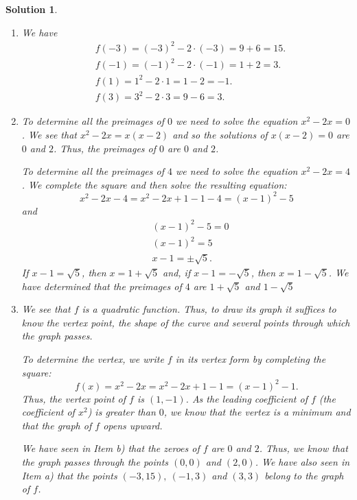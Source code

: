 \documentclass[12pt]{article}
\newtheorem{sol}[prop]{Solution}
\begin{document}
\begin{sol}
\begin{enumerate}
\item[a)]  We have 
\begin{equation*}
\begin{split}
& f(-3)=(-3)^{2}-2\cdot (-3)=9+6=15.\\
& f(-1)=(-1)^{2}-2\cdot (-1)=1+2=3.\\
& f(1)=1^{2}-2\cdot 1=1-2=-1.\\
& f(3)=3^{2}-2\cdot 3=9-6=3.
\end{split}
\end{equation*}
\item[b)] To determine all the preimages of $0$ we need to solve the equation $x^{2}-2x=0$. We see that $x^{2}-2x=x(x-2)$ and so the solutions of $x(x-2)=0$ are $0$ and $2$. Thus, the preimages of $0$ are $0$ and $2$.

To determine all the preimages of $4$ we need to solve the equation $x^{2}-2x=4$. We complete the square and then solve the resulting equation:
$$x^{2}-2x-4=x^{2}-2x+1-1-4=(x-1)^{2}-5$$
and 
\begin{equation*}
\begin{split}
& (x-1)^{2}-5=0\\
&(x-1)^{2}=5\\
& x-1=\pm \sqrt{5}.
\end{split}
\end{equation*}
If $x-1=\sqrt{5}$, then $x=1+\sqrt{5}$ and, if $x-1=-\sqrt{5}$, then $x=1-\sqrt{5}$. We have determined that the preimages of $4$ are $1+\sqrt{5}$ and $1-\sqrt{5}$
\item[c)] We see that $f$ is a quadratic function. Thus, to draw its graph it suffices to know the vertex point, the shape of the curve and several points through which the graph passes.

To determine the vertex, we write $f$ in its vertex form by completing the square:
$$f(x)=x^{2}-2x=x^{2}-2x+1-1=(x-1)^{2}-1.$$
Thus, the vertex point of $f$ is $(1,-1)$. As the leading coefficient of $f$ (the coefficient of $x^{2}$) is greater than $0$, we know that the vertex is a minimum and that the graph of $f$ opens upward.  

We have seen in Item b) that the zeroes of $f$ are $0$ and $2$. Thus, we know that the graph passes through the points $(0,0)$ and $(2,0)$. We have also seen in Item a) that the points $(-3,15), \ (-1,3)$ and $(3,3)$ belong to the graph of $f$.


\end{enumerate}
\end{sol}
\end{document}
